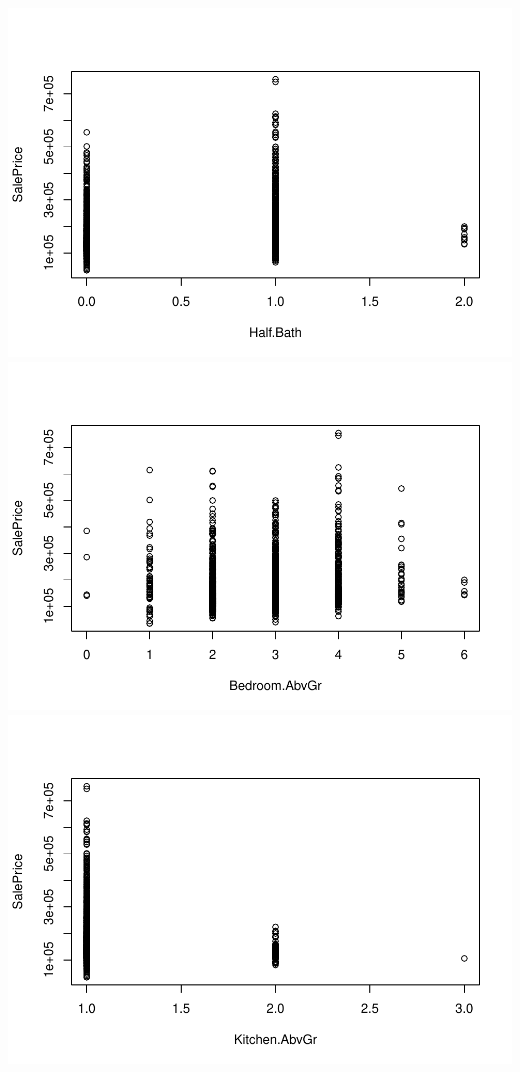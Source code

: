 \documentclass[
]{article}
\begin{document}
\includegraphics{Predicting-Housing-Price_files/figure-latex/unnamed-chunk-2-19.pdf}
\includegraphics{Predicting-Housing-Price_files/figure-latex/unnamed-chunk-2-20.pdf}
\includegraphics{Predicting-Housing-Price_files/figure-latex/unnamed-chunk-2-21.pdf}
\end{document}
